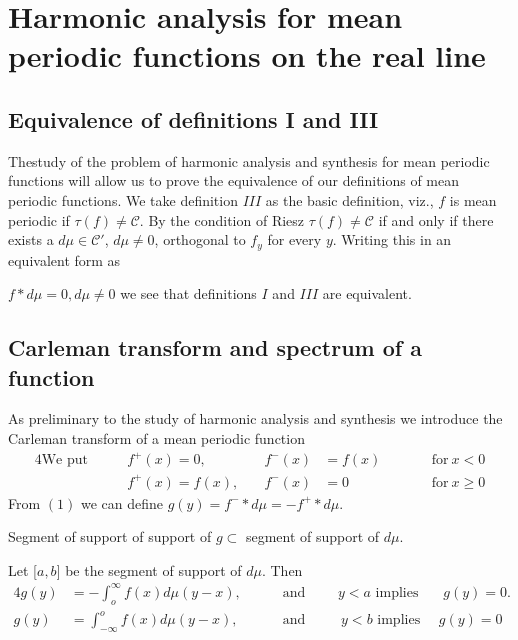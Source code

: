 \chapter[Harmonic analysis for mean periodic functions...]{Harmonic analysis for mean periodic functions on
 the real line}\label{chap4}%

\section{Equivalence of definitions I and III}\label{chap4:sec1}%

The\pageoriginale study of the problem of harmonic analysis and synthesis for mean
periodic functions will allow us to prove the equivalence of our
definitions of mean periodic functions. We take definition $III$ as
the basic definition, viz., $f$ is mean periodic if $\tau (f) \neq
\mathscr{C}$. By the condition of Riesz $\tau (f) \neq \mathscr{C}$
if and only if there exists a $d \mu \in \mathscr{C}'$, $d \mu \neq
0$, orthogonal to $f_y$ for every $y$. Writing this in an equivalent
form as 

$f * d \mu = 0, d \mu \neq 0$ we see that definitions $I$ and $III$
are equivalent. 

\section{Carleman transform and spectrum of a function}\label{chap4:sec2} %

As preliminary to the study of harmonic analysis and synthesis we
introduce the Carleman transform of a mean periodic function 
\begin{alignat*}{4}
 \text{We put}\qquad & f^+ (x) = 0, \quad &f^{-}(x) & =
 f (x) & \qquad &\text{for}~ x < 0 \\ 
 & f^{+} (x) = f(x), \quad &f^{-}(x) & = 0 & &\text{for}~ x \geq 0 
\end{alignat*}
From $(1)$ we can define $g(y) = f^{-} * d \mu = -f^+ * d \mu$.

\begin{lemma*}%
 Segment of support of support of $g \subset $ segment of support of $d \mu $.
\end{lemma*}

Let [$a, b$] be the segment of support of $d \mu$. Then
\begin{alignat*}{4}
 g(y) &= - \int_o^\infty f(x) d\mu (y - x), &\quad &\text{ and }\qquad y < a
 \text{ implies } ~~\quad g(y) = 0.\\ 
 g(y) &= \int_{-\infty}^{o} f(x) d\mu (y - x), &&\text{ and }
 \qquad ~y < b \text{ implies }\quad g(y) = 0 
\end{alignat*}

